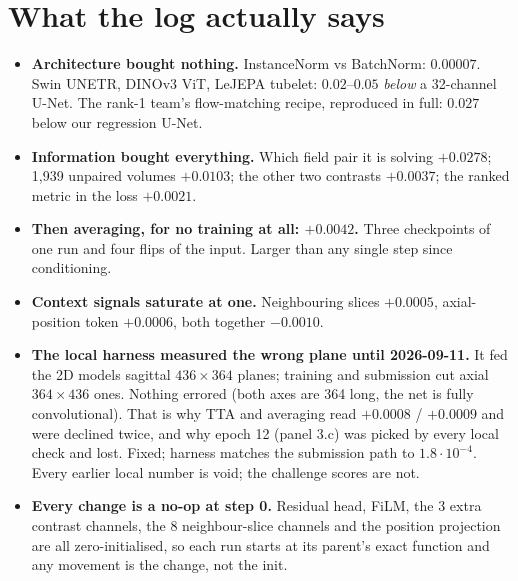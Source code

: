 \documentclass[10pt,a4paper]{article}
\begin{document}
\small

\section*{What the log actually says}

\begin{itemize}\setlength{\itemsep}{0.6mm}
\item \textbf{Architecture bought nothing.} InstanceNorm vs BatchNorm: $0.00007$. Swin UNETR,
  DINOv3 ViT, LeJEPA tubelet: $0.02$--$0.05$ \emph{below} a 32-channel U-Net. The rank-1 team's
  flow-matching recipe, reproduced in full: $0.027$ below our regression U-Net.
\item \textbf{Information bought everything.} Which field pair it is solving $+0.0278$; 1{,}939
  unpaired volumes $+0.0103$; the other two contrasts $+0.0037$; the ranked metric in the loss
  $+0.0021$.
\item \textbf{Then averaging, for no training at all: $+0.0042$.} Three checkpoints of one run
  and four flips of the input. Larger than any single step since conditioning.
\item \textbf{Context signals saturate at one.} Neighbouring slices $+0.0005$, axial-position
  token $+0.0006$, both together $-0.0010$.
\item \textbf{The local harness measured the wrong plane until 2026-09-11.} It fed the 2D models
  sagittal $436\times364$ planes; training and submission cut axial $364\times436$ ones. Nothing
  errored (both axes are 364 long, the net is fully convolutional). That is why TTA and averaging
  read $+0.0008$ / $+0.0009$ and were declined twice, and why epoch 12 (panel 3.c) was picked by
  every local check and lost. Fixed; harness matches the submission path to $1.8\cdot10^{-4}$.
  Every earlier local number is void; the challenge scores are not.
\item \textbf{Every change is a no-op at step 0.} Residual head, FiLM, the 3 extra contrast
  channels, the 8 neighbour-slice channels and the position projection are all zero-initialised,
  so each run starts at its parent's exact function and any movement is the change, not the init.
\end{itemize}
\end{document}
